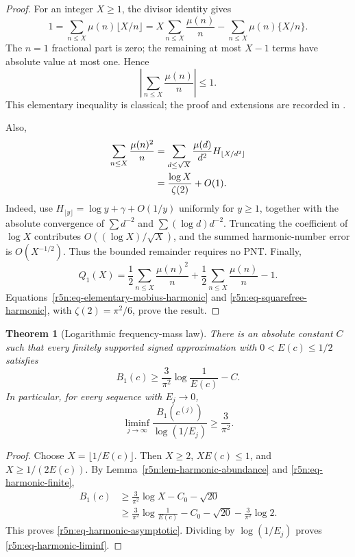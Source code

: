\documentclass[11pt,a4paper]{article}
\newtheorem{theorem}{Theorem}[section]
\theoremstyle{definition}\newtheorem{definition}[theorem]{Definition}
\theoremstyle{remark}\newtheorem{remark}[theorem]{Remark}
\numberwithin{equation}{section}
\begin{document}
\begin{proof}
For an integer \(X\ge1\), the divisor identity gives
\[
 1=\sum_{n\le X}\mu(n)\lfloor X/n\rfloor
  =X\sum_{n\le X}\frac{\mu(n)}n
    -\sum_{n\le X}\mu(n)\{X/n\}.
\]
The \(n=1\) fractional part is zero; the remaining at most \(X-1\)
terms have absolute value at most one. Hence
\begin{equation}
\label{r5n:eq-elementary-mobius-harmonic}
 \left|\sum_{n\le X}\frac{\mu(n)}n\right|\le1.
\end{equation}
This elementary inequality is classical; the proof and extensions
are recorded in \cite[Equation~(1.3)]{TaoMobius}.

Also,
\begin{align}
\label{r5n:eq-squarefree-harmonic}
 \sum_{n\le X}\frac{\mu(n)^2}{n}
 &=\sum_{d\le\sqrt X}\frac{\mu(d)}{d^2}
                         H_{\lfloor X/d^2\rfloor}\notag\\
 &=\frac{\log X}{\zeta(2)}+O(1).
\end{align}
Indeed, use
\(H_{\lfloor y\rfloor}=\log y+\gamma+O(1/y)\) uniformly for
\(y\ge1\), together with the absolute convergence of
\(\sum d^{-2}\) and \(\sum(\log d)d^{-2}\).
Truncating the coefficient of \(\log X\) contributes
\(O((\log X)/\sqrt X)\), and the summed harmonic-number error
is \(O(X^{-1/2})\). Thus the bounded remainder requires no PNT.
Finally,
\[
 Q_1(X)
 =\frac12\sum_{n\le X}\frac{\mu(n)^2}{n}
  +\frac12\sum_{n\le X}\frac{\mu(n)}n-1.
\]
Equations~\eqref{r5n:eq-elementary-mobius-harmonic} and
\eqref{r5n:eq-squarefree-harmonic}, with
\(\zeta(2)=\pi^2/6\), prove the result.
\end{proof}

\begin{theorem}[Logarithmic frequency-mass law]
\label{r5n:thm-harmonic-mass}
There is an absolute constant \(C\) such that every finitely
supported signed approximation with \(0<E(c)\le1/2\) satisfies
\begin{equation}
\label{r5n:eq-harmonic-asymptotic}
 B_1(c)\ge\frac3{\pi^2}\log\frac1{E(c)}-C.
\end{equation}
In particular, for every sequence with \(E_j\to0\),
\begin{equation}
\label{r5n:eq-harmonic-liminf}
 \liminf_{j\to\infty}
 \frac{B_1(c^{(j)})}{\log(1/E_j)}\ge\frac3{\pi^2}.
\end{equation}
\end{theorem}

\begin{proof}
Choose \(X=\lfloor1/E(c)\rfloor\). Then \(X\ge2\),
\(XE(c)\le1\), and \(X\ge1/(2E(c))\). By
Lemma~\ref{r5n:lem-harmonic-abundance} and
\eqref{r5n:eq-harmonic-finite},
\[
 \begin{aligned}
 B_1(c)
 &\ge\frac3{\pi^2}\log X-C_0-\sqrt{20}\\
 &\ge\frac3{\pi^2}\log\frac1{E(c)}
       -C_0-\sqrt{20}-\frac3{\pi^2}\log2.
 \end{aligned}
\]
This proves \eqref{r5n:eq-harmonic-asymptotic}.
Dividing by \(\log(1/E_j)\) proves
\eqref{r5n:eq-harmonic-liminf}.
\end{proof}
\end{document}
